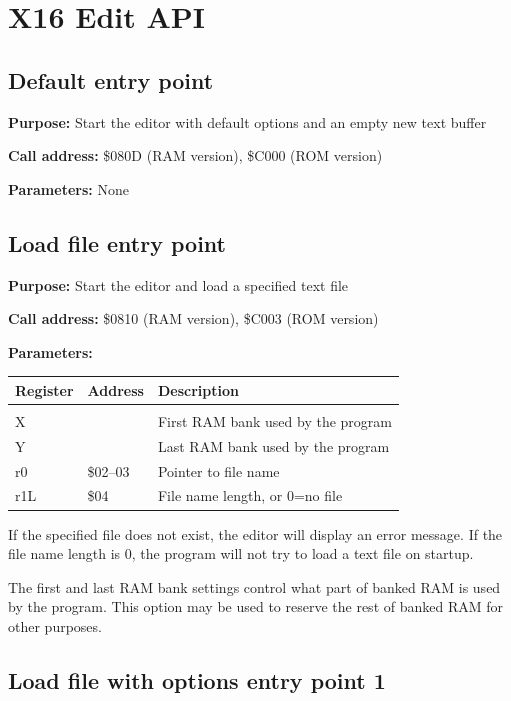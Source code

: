 \documentclass{article}
\begin{document}
\newpage
\section{X16 Edit API}

    \subsection{Default entry point}

        \textbf{Purpose:} Start the editor with default options and an empty new text buffer

        \textbf{Call address:} \$080D (RAM version), \$C000 (ROM version)
    
        \textbf{Parameters:} None

    \subsection{Load file entry point}
        
        \textbf{Purpose:} Start the editor and load a specified text file

        \textbf{Call address:} \$0810 (RAM version), \$C003 (ROM version)

        \textbf{Parameters:} 

        \begin{longtable}[l]{l l l}
            \textbf{Register} & \textbf{Address} & \textbf{Description} \\
	        \hline \\
            X   &          & First RAM bank used by the program \\
            Y   &          & Last RAM bank used by the program \\
            r0  & \$02--03 & Pointer to file name \\
            r1L & \$04     & File name length, or 0=no file \\
        \end{longtable}

        If the specified file does not exist, the editor will display an
        error message. If the file name length is 0, the program will not try
        to load a text file on startup.

        The first and last RAM bank settings control what part of banked RAM is
        used by the program. This option may be used to reserve the rest of banked RAM
        for other purposes.

    \subsection{Load file with options entry point 1}
\end{document}
